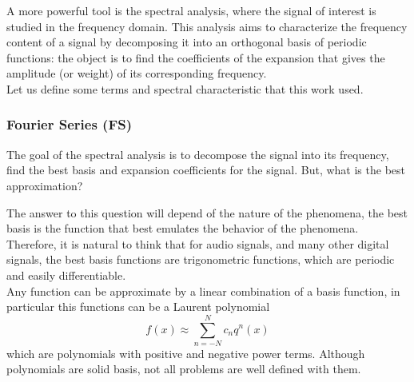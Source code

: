 A more powerful tool is the spectral analysis, where the signal of interest is studied in the frequency domain. This analysis aims to characterize the frequency content of a signal by decomposing it into an orthogonal basis of periodic functions: the object is to find the coefficients of the expansion that gives the amplitude (or weight) of its corresponding frequency.\\

Let us define some terms and spectral characteristic that this work used.


\subsubsection{Fourier Series (FS)}

The goal of the spectral analysis is to decompose the signal into its frequency, find the best basis and expansion coefficients for the signal. But, what is the best approximation?

The answer to this question will depend of the nature of the phenomena, the best basis is the function that best emulates the behavior of the phenomena. Therefore, it is natural to think that for audio signals, and many other digital signals, the best basis functions are trigonometric functions, which are periodic and easily differentiable.\\

Any function can be approximate by a linear combination of a basis function, in particular this functions can be a Laurent polynomial
\begin{equation*}
    f(x) \approx \sum_{n=-N}^N c_n q^n(x)
\end{equation*}
which are polynomials with positive and negative power terms. Although polynomials are solid basis, not all problems are well defined with them.\\

